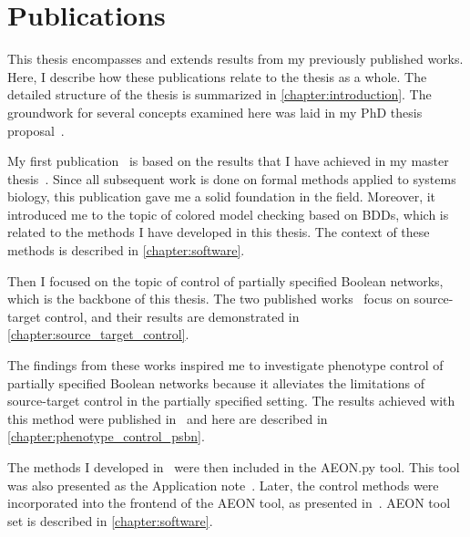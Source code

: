 

\chapter*{Publications} %

This thesis encompasses and extends results from my previously published works. Here, I describe how these publications relate to the thesis as a whole. The detailed structure of the thesis is summarized in \autoref{chapter:introduction}. The groundwork for several concepts examined here was laid in my PhD thesis proposal~\cite{Smijakova2021}.

My first publication~\spacedlowsmallcaps{[CMSB'20]} is based on the results that I have achieved in my master thesis~\cite{Smijakova2019}. Since all subsequent work is done on formal methods applied to systems biology, this publication gave me a solid foundation in the field. Moreover, it introduced me to the topic of colored model checking based on BDDs, which is related to the methods I have developed in this thesis. The context of these methods is described in \autoref{chapter:software}.

Then I focused on the topic of control of partially specified Boolean networks, which is the backbone of this thesis. The two published works~ focus on source-target control, and their results are demonstrated in \autoref{chapter:source_target_control}.

The findings from these works inspired me to investigate phenotype control of partially specified Boolean networks because it alleviates the limitations of source-target control in the partially specified setting. The results achieved with this method were published in~\spacedlowsmallcaps{[CMSB'23]} and here are described in \autoref{chapter:phenotype_control_psbn}.

The methods I developed in~ were then included in the AEON.py tool. This tool was also presented as the Application note~\spacedlowsmallcaps{[Bioinf'23]}. Later, the control methods were incorporated into the frontend of the AEON tool, as presented in~\spacedlowsmallcaps{[CMSB'25]}. AEON tool set is described in \autoref{chapter:software}.

